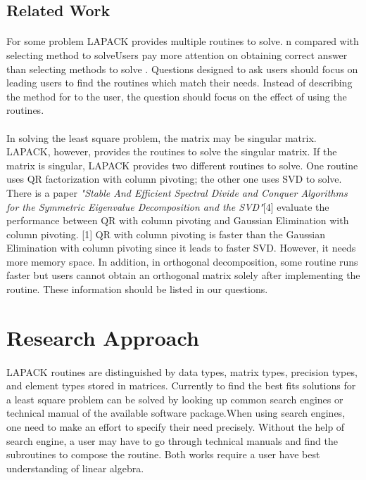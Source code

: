 \documentclass[pdftex,12pt,a4paper]{article}
\begin{document}
\subsection{Related Work}
\paragraph{}
For some problem LAPACK provides multiple routines to solve. n compared with selecting method to solveUsers pay more attention on obtaining correct answer than selecting methods to solve . Questions designed to ask users should  focus on leading users to find the routines which match their needs. Instead of describing the method for to the  user, the question should focus on the effect of using the routines. 
\paragraph{}
In solving the least square problem, the matrix may be singular matrix. LAPACK, however,  provides the routines to solve the singular matrix. If the matrix is singular, LAPACK provides two different routines to solve. One routine uses QR factorization with column pivoting; the other one uses SVD to solve.  There is a paper \textit{"Stable And Efficient Spectral Divide and Conquer Algorithms for the Symmetric Eigenvalue Decomposition and the SVD"}[4] evaluate the performance between QR with column pivoting and Gaussian Elimination with column pivoting. 
[1] QR with column pivoting is faster than the Gaussian Elimination with column pivoting since it leads to faster SVD. However, it needs more memory space. In addition, in orthogonal decomposition, some routine runs faster but users cannot obtain an orthogonal matrix solely after implementing the routine. These information should be listed in our questions. 
\section{Research Approach}
\paragraph{}
LAPACK routines are distinguished by data types, matrix types, precision types, and element types stored in matrices. Currently to find the best fits solutions for a least square problem can be solved by  looking up common search engines or technical manual of the available software package.When using search engines, one need to make an  effort to specify their need precisely. Without the help of search engine, a  user may have to go through technical manuals and find the subroutines to compose the routine. Both works require a user have best understanding of linear algebra. 
\end{document}
